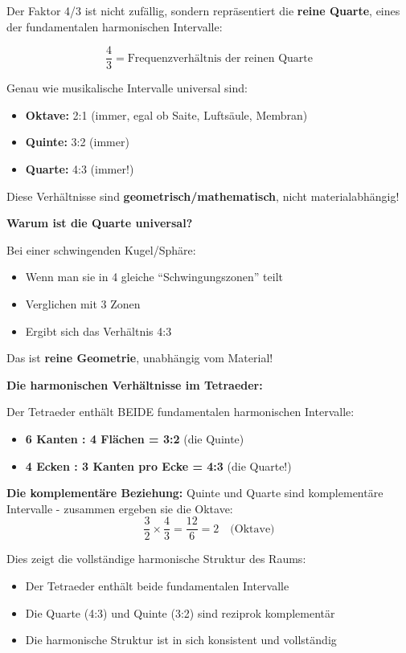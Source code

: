 Der Faktor 4/3 ist nicht zufällig, sondern repräsentiert die \textbf{reine Quarte}, eines der fundamentalen harmonischen Intervalle:

\begin{equation}
	\frac{4}{3} = \text{Frequenzverhältnis der reinen Quarte}
\end{equation}

Genau wie musikalische Intervalle universal sind:
\begin{itemize}
	\item \textbf{Oktave:} 2:1 (immer, egal ob Saite, Luftsäule, Membran)
	\item \textbf{Quinte:} 3:2 (immer)
	\item \textbf{Quarte:} 4:3 (immer!)
\end{itemize}

Diese Verhältnisse sind \textbf{geometrisch/mathematisch}, nicht materialabhängig!

\textbf{Warum ist die Quarte universal?}

Bei einer schwingenden Kugel/Sphäre:
\begin{itemize}
	\item Wenn man sie in 4 gleiche ``Schwingungszonen'' teilt
	\item Verglichen mit 3 Zonen
	\item Ergibt sich das Verhältnis 4:3
\end{itemize}

Das ist \textbf{reine Geometrie}, unabhängig vom Material!

\textbf{Die harmonischen Verhältnisse im Tetraeder:}

Der Tetraeder enthält BEIDE fundamentalen harmonischen Intervalle:
\begin{itemize}
	\item \textbf{6 Kanten : 4 Flächen = 3:2} (die Quinte)
	\item \textbf{4 Ecken : 3 Kanten pro Ecke = 4:3} (die Quarte!)
\end{itemize}

\textbf{Die komplementäre Beziehung:}
Quinte und Quarte sind komplementäre Intervalle - zusammen ergeben sie die Oktave:
\begin{equation}
	\frac{3}{2} \times \frac{4}{3} = \frac{12}{6} = 2 \quad \text{(Oktave)}
\end{equation}

Dies zeigt die vollständige harmonische Struktur des Raums:
\begin{itemize}
	\item Der Tetraeder enthält beide fundamentalen Intervalle
	\item Die Quarte (4:3) und Quinte (3:2) sind reziprok komplementär
	\item Die harmonische Struktur ist in sich konsistent und vollständig
\end{itemize}

